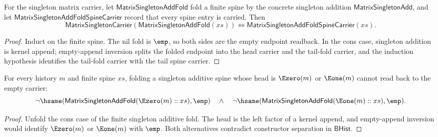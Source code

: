 \begin{theorem}
\label{thm:matrix-singleton-add-fold-carrier-iff}
For the singleton matrix carrier, let
$\mathsf{MatrixSingletonAddFold}$ fold a finite spine by the concrete
singleton addition $\mathsf{MatrixSingletonAdd}$, and let
$\mathsf{MatrixSingletonAddFoldSpineCarrier}$ record that every spine entry
is carried. Then
$$
\mathsf{MatrixSingletonCarrier}(\mathsf{MatrixSingletonAddFold}(xs))
\Longleftrightarrow
\mathsf{MatrixSingletonAddFoldSpineCarrier}(xs).
$$
\end{theorem}
\begin{proof}
Induct on the finite spine. The nil fold is $\emp$, so both sides are the
empty endpoint readback. In the cons case, singleton addition is kernel
append; empty-append inversion splits the folded endpoint into the head
carrier and the tail-fold carrier, and the induction hypothesis identifies the
tail-fold carrier with the tail spine carrier.
\end{proof}

\begin{theorem}
\label{thm:matrix-singleton-add-fold-visible-head-absurd}
For every history $m$ and finite spine $xs$, folding a singleton additive spine
whose head is $\Ezero(m)$ or $\Eone(m)$ cannot read back to the empty carrier:
$$
\neg\hsame(\mathsf{MatrixSingletonAddFold}(\Ezero(m)::xs),\emp)
\quad\wedge\quad
\neg\hsame(\mathsf{MatrixSingletonAddFold}(\Eone(m)::xs),\emp).
$$
\end{theorem}
\begin{proof}
Unfold the cons case of the finite singleton additive fold. The head is the
left factor of a kernel append, and empty-append inversion would identify
$\Ezero(m)$ or $\Eone(m)$ with $\emp$. Both alternatives contradict constructor
separation in $\mathsf{BHist}$.
\end{proof}

